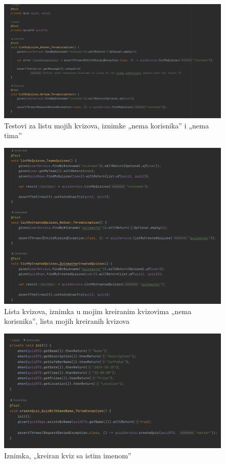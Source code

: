 				\begin{figure}[H]
					\includegraphics[width=\textwidth]{slike/QuizServiceImplTest2.PNG} 
					\caption{Testovi za listu mojih kvizova, iznimke „nema korisnika” i „nema tima”}
					\label{fig:QuizServiceImplTest2}
				\end{figure}
			
				\begin{figure}[H]
					\includegraphics[width=\textwidth]{slike/QuizServiceImplTest3.PNG} 
					\caption{Lista kvizova, iznimka u mojim kreiranim kvizovima „nema korisnika”, lista mojih kreiranih kvizova}
					\label{fig:QuizServiceImplTest3}
				\end{figure}
			
				\begin{figure}[H]
					\includegraphics[width=\textwidth]{slike/QuizServiceImplTest4.PNG} 
					\caption{Iznimka, „kreiran kviz sa istim imenom”}
					\label{fig:QuizServiceImplTest4}
				\end{figure}
			

